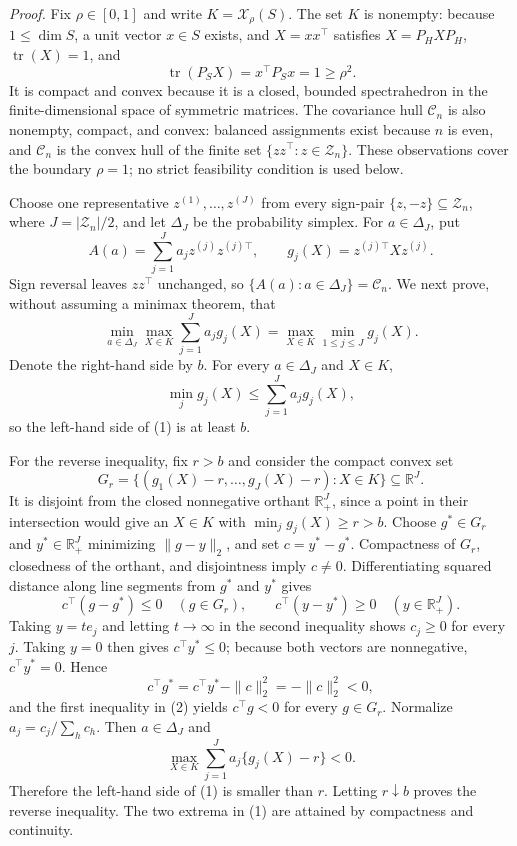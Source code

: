 \textit{Proof.}
Fix \(\rho\in[0,1]\) and write \(K=\mathcal X_\rho(S)\).  The set \(K\) is nonempty: because \(1\leq\dim S\), a unit vector \(x\in S\) exists, and \(X=xx^\top\) satisfies \(X=P_HXP_H\), \(\operatorname{tr}(X)=1\), and
\[
\operatorname{tr}(P_SX)=x^\top P_Sx=1\geq\rho^2.
\]
It is compact and convex because it is a closed, bounded spectrahedron in the finite-dimensional space of symmetric matrices.  The covariance hull \(\mathcal C_n\) is also nonempty, compact, and convex: balanced assignments exist because \(n\) is even, and \(\mathcal C_n\) is the convex hull of the finite set \(\{zz^\top:z\in\mathcal Z_n\}\).  These observations cover the boundary \(\rho=1\); no strict feasibility condition is used below.

Choose one representative \(z^{(1)},\ldots,z^{(J)}\) from every sign-pair \(\{z,-z\}\subseteq\mathcal Z_n\), where \(J=|\mathcal Z_n|/2\), and let \(\Delta_J\) be the probability simplex.  For \(a\in\Delta_J\), put
\[
A(a)=\sum_{j=1}^J a_j z^{(j)}z^{(j)\top},
\qquad
g_j(X)=z^{(j)\top}Xz^{(j)}.
\]
Sign reversal leaves \(zz^\top\) unchanged, so \(\{A(a):a\in\Delta_J\}=\mathcal C_n\).  We next prove, without assuming a minimax theorem, that
\[
\min_{a\in\Delta_J}\max_{X\in K}\sum_{j=1}^J a_jg_j(X)
=
\max_{X\in K}\min_{1\leq j\leq J}g_j(X).
\tag{1}
\]
Denote the right-hand side by \(b\).  For every \(a\in\Delta_J\) and \(X\in K\),
\[
\min_j g_j(X)\leq\sum_{j=1}^J a_jg_j(X),
\]
so the left-hand side of (1) is at least \(b\).

For the reverse inequality, fix \(r>b\) and consider the compact convex set
\[
G_r=\{(g_1(X)-r,\ldots,g_J(X)-r):X\in K\}\subseteq\mathbb R^J.
\]
It is disjoint from the closed nonnegative orthant \(\mathbb R_+^J\), since a point in their intersection would give an \(X\in K\) with \(\min_jg_j(X)\geq r>b\).  Choose \(g^*\in G_r\) and \(y^*\in\mathbb R_+^J\) minimizing \(\|g-y\|_2\), and set \(c=y^*-g^*\).  Compactness of \(G_r\), closedness of the orthant, and disjointness imply \(c\neq0\).  Differentiating squared distance along line segments from \(g^*\) and \(y^*\) gives
\[
c^\top(g-g^*)\leq0\quad(g\in G_r),
\qquad
c^\top(y-y^*)\geq0\quad(y\in\mathbb R_+^J).
\tag{2}
\]
Taking \(y=t e_j\) and letting \(t\to\infty\) in the second inequality shows \(c_j\geq0\) for every \(j\).  Taking \(y=0\) then gives \(c^\top y^*\leq0\); because both vectors are nonnegative, \(c^\top y^*=0\).  Hence
\[
c^\top g^*=c^\top y^*-\|c\|_2^2=-\|c\|_2^2<0,
\]
and the first inequality in (2) yields \(c^\top g<0\) for every \(g\in G_r\).  Normalize \(a_j=c_j/\sum_hc_h\).  Then \(a\in\Delta_J\) and
\[
\max_{X\in K}\sum_{j=1}^J a_j\{g_j(X)-r\}<0.
\]
Therefore the left-hand side of (1) is smaller than \(r\).  Letting \(r\downarrow b\) proves the reverse inequality.  The two extrema in (1) are attained by compactness and continuity.

